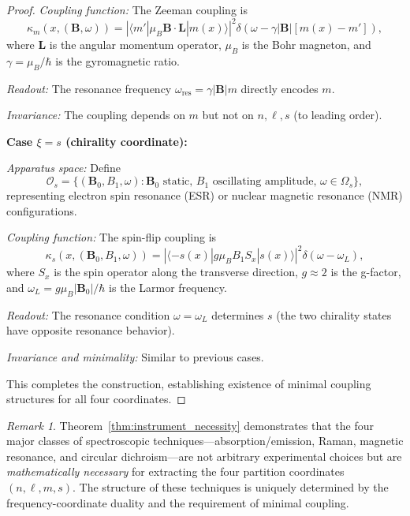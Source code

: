 \documentclass[twocolumn,10pt,a4paper]{article}
\theoremstyle{remark}
\newtheorem{remark}[theorem]{Remark}
\newcommand{\oscillator}{\mathcal{O}}
\begin{document}
\begin{proof}
\emph{Coupling function:} The Zeeman coupling is
\begin{equation}
\kappa_m(x, (\mathbf{B}, \omega)) = \left|\langle m' | \mu_B \mathbf{B} \cdot \mathbf{L} | m(x) \rangle\right|^2 \delta(\omega - \gamma |\mathbf{B}| [m(x) - m']),
\end{equation}
where $\mathbf{L}$ is the angular momentum operator, $\mu_B$ is the Bohr magneton, and $\gamma = \mu_B / \hbar$ is the gyromagnetic ratio.

\emph{Readout:} The resonance frequency $\omega_{\text{res}} = \gamma |\mathbf{B}| m$ directly encodes $m$.

\emph{Invariance:} The coupling depends on $m$ but not on $n, \ell, s$ (to leading order).

\textbf{Case $\xi = s$ (chirality coordinate):}

\emph{Apparatus space:} Define
\begin{equation}
\oscillator_s = \{(\mathbf{B}_0, B_1, \omega) : \mathbf{B}_0 \text{ static}, \, B_1 \text{ oscillating amplitude}, \, \omega \in \Omega_s\},
\end{equation}
representing electron spin resonance (ESR) or nuclear magnetic resonance (NMR) configurations.

\emph{Coupling function:} The spin-flip coupling is
\begin{equation}
\kappa_s(x, (\mathbf{B}_0, B_1, \omega)) = \left|\langle -s(x) | g \mu_B B_1 S_x | s(x) \rangle\right|^2 \delta(\omega - \omega_L),
\end{equation}
where $S_x$ is the spin operator along the transverse direction, $g \approx 2$ is the g-factor, and $\omega_L = g \mu_B |\mathbf{B}_0| / \hbar$ is the Larmor frequency.

\emph{Readout:} The resonance condition $\omega = \omega_L$ determines $s$ (the two chirality states have opposite resonance behavior).

\emph{Invariance and minimality:} Similar to previous cases.

This completes the construction, establishing existence of minimal coupling structures for all four coordinates.
\end{proof}

\begin{remark}
Theorem~\ref{thm:instrument_necessity} demonstrates that the four major classes of spectroscopic techniques—absorption/emission, Raman, magnetic resonance, and circular dichroism—are not arbitrary experimental choices but are \emph{mathematically necessary} for extracting the four partition coordinates $(n, \ell, m, s)$. The structure of these techniques is uniquely determined by the frequency-coordinate duality and the requirement of minimal coupling.
\end{remark}
\end{document}
